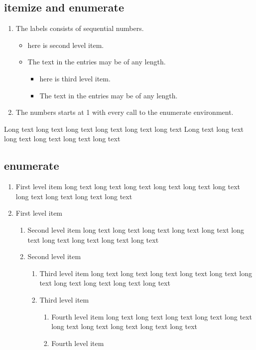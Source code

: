 \documentclass{akabook}
\theoremstyle{definition}
\begin{document}
\subsection{itemize and enumerate}
\begin{enumerate}
   \item The labels consists of sequential numbers.
   \begin{itemize}
     \item here is second level item.
     \item The text in the entries may be of any length.
       \begin{itemize}
         \item here is third level item.
         \item The text in the entries may be of any length.
       \end{itemize}
   \end{itemize}
   \item The numbers starts at 1 with every call to the enumerate environment.
\end{enumerate}

Long text long text long text long text long text long text
Long text long text long text long text long text long text

\subsection{enumerate}
 \begin{enumerate}
   \item First level item  long text long text long text long text long text long text long text long text long text long text 
   \item First level item
   \begin{enumerate}
     \item Second level item long text long text long text long text long text long text long text 
long text long text long text
     \item Second level item
     \begin{enumerate}
       \item Third level item long text long text long text long text long text long text long text 
long text long text long text
       \item Third level item
       \begin{enumerate}
         \item Fourth level item long text long text long text long text long text long text long 
text long text long text long text
         \item Fourth level item
       \end{enumerate}
     \end{enumerate}
   \end{enumerate}
 \end{enumerate}
\end{document}
